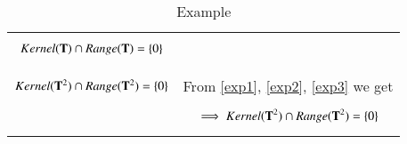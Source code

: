 \documentclass[journal,12pt]{IEEEtran}
\begin{document}
\begin{longtable}{|l|l|}
{\begin{align}
    Kernel(\mathbf{T})\cap Range(\mathbf{T})=\left\{0\right\}\label{exp3}
\end{align}}\\&\\
\hline
$Kernel(\mathbf{T}^2)\cap Range(\mathbf{T}^2)=\left\{0\right\}$&From \eqref{exp1}, \eqref{exp2}, \eqref{exp3} we get\\&\parbox{11cm}{\begin{align}
    \implies Kernel(\mathbf{T}^2)\cap Range(\mathbf{T}^2)=\left\{0\right\}
\end{align}}\\
\hline
\caption{Example}
\label{exp}
\end{longtable}
\end{document}

